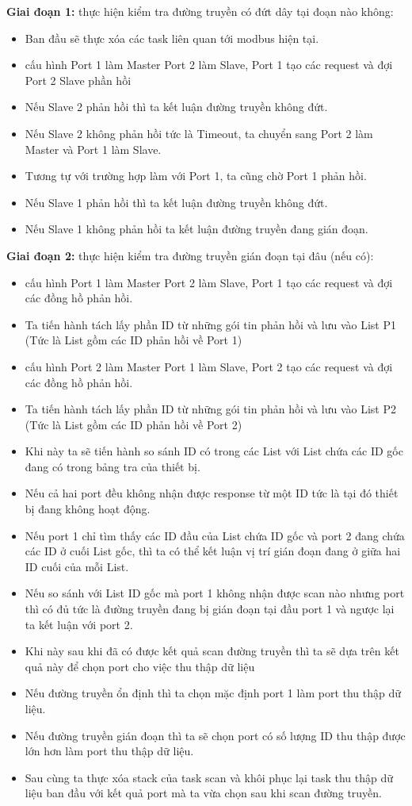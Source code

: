 \textbf{Giai đoạn 1:} thực hiện kiểm tra đường truyền có đứt dây tại đoạn nào không:
\begin{itemize}
    \item Ban đầu sẽ thực xóa các task liên quan tới modbus hiện tại.
    \item cấu hình Port 1 làm Master Port 2 làm Slave, Port 1 tạo các request và đợi Port 2 Slave phần hồi
    \item Nếu Slave 2 phản hồi thì ta kết luận đường truyền không đứt.
    \item Nếu Slave 2 không phản hồi tức là Timeout, ta chuyển sang Port 2 làm Master và Port 1 làm Slave.
    \item Tương tự với trường hợp làm với Port 1, ta cũng chờ Port 1 phản hồi.
    \item Nếu Slave 1 phản hồi thì ta kết luận đường truyền không đứt.
    \item Nếu Slave 1 không phản hồi ta kết luận đường truyền đang gián đoạn.
\end{itemize}

\textbf{Giai đoạn 2:} thực hiện kiểm tra đường truyền gián đoạn tại đâu (nếu có):
\begin{itemize}
    \item cấu hình Port 1 làm Master Port 2 làm Slave, Port 1 tạo các request và đợi các đồng hồ phản hồi.
    \item Ta tiến hành tách lấy phần ID từ những gói tin phản hồi và lưu vào List P1 (Tức là List gồm các ID phản hồi về Port 1)
    \item cấu hình Port 2 làm Master Port 1 làm Slave, Port 2 tạo các request và đợi các đồng hồ phản hồi.
    \item Ta tiến hành tách lấy phần ID từ những gói tin phản hồi và lưu vào List P2 (Tức là List gồm các ID phản hồi về Port 2)
    \item Khi này ta sẽ tiến hành so sánh ID có trong các List với List chứa các ID gốc đang có trong bảng tra của thiết bị.
    \item Nếu cả hai port đều không nhận được response từ một ID tức là tại đó thiết bị đang không hoạt động.
    \item Nếu port 1 chỉ tìm thấy các ID đầu của List chứa ID gốc và port 2 đang chứa các ID ở cuối List gốc, thì ta có thể kết luận vị trí gián đoạn đang ở giữa hai ID cuối của mỗi List.
    \item Nếu so sánh với List ID gốc mà port 1 không nhận được scan nào nhưng port thì có đủ tức là đường truyền đang bị gián đoạn tại đầu port 1 và ngược lại ta kết luận với port 2.
    \item Khi này sau khi đã có được kết quả scan đường truyền thì ta sẽ dựa trên kết quả này để chọn port cho việc thu thập dữ liệu
    \item Nếu đường truyền ổn định thì ta chọn mặc định port 1 làm port thu thập dữ liệu.
    \item Nếu đường truyền gián đoạn thì ta sẽ chọn port có số lượng ID thu thập được lớn hơn làm port thu thập dữ liệu.
    \item Sau cùng ta thực xóa stack của task scan và khôi phục lại task thu thập dữ liệu ban đầu với kết quả port mà ta vừa chọn sau khi scan đường truyền.
\end{itemize}

